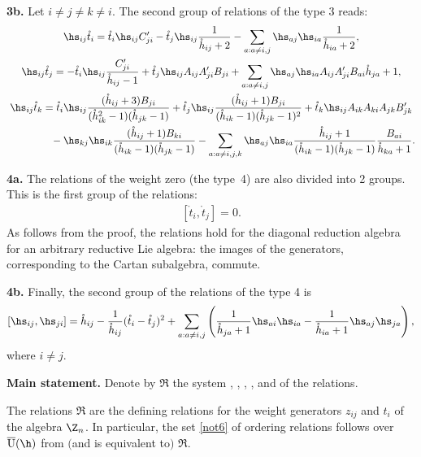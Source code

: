 \documentclass[pdftex]{sigma}
\def\Cprime{C'}\def\ds{\displaystyle}\newcommand{\fracds}[2]{{\ds \frac{#1}{#2}}}
\def\nplus{\mathfrak{n}}\def\nn{\nonumber}\def\nin{\noindent}
\def\s{z}\def\S{\mathrm {S}}\def\si{\sigma}\def\Sp{\S^{\nplus}}\def\sy{\acute{\sigma}}\def\th{\mathring{h}}
\def\tphi{A}\def\tpsi{A'}\def\tphiplus{B}\def\tpsiminus{B'}\def\ttphi{B}\def\ttpsi{B'}\def\ts{\hskip1pt}\def\tts{\hskip.5pt}
\def\tt{\mathring{t}}\def\U{\mathrm{U}}\def\Uh{\overline{\U}(\h)}\def\UU{\overline{\U}}\def\UUh{{\cal{D}}(\h)}
\numberwithin{equation}{section}
\begin{document}
{\bf 3b.} Let $i\neq j\neq k\neq i$. The second group of relations of the type 3 reads:
\begin{gather}\notag\hs_{ij}\tt_{i}=  \tt_i\hs_{ij}\Cprime_{ji}-\tt_j\hs_{ij}  \frac{1}{\th_{ij}+2}-
\sum_{a:a\not=i,j}\hs_{aj}\hs_{ia}  \frac{1}{\th_{ia}+2}  ,\\
\label{3.12}\hs_{ij}\tt_{j}= -\tt_i\hs_{ij}  \frac{\Cprime_{ji}}{\th_{ij}-1}+
\tt_j\hs_{ij}\tphi_{ij}\tpsi_{ji}\ttphi_{ji}+
\sum_{a:a\not=i,j}\hs_{aj}\hs_{ia}\tphi_{ij}\tpsi_{ji}{\ttphi_{ai}}{\th_{ja}+1}  ,\\  \notag
\hs_{ij}\tt_{k}= \tt_i\hs_{ij}  \frac{(\th_{ij}+3)\ttphi_{ji}}{(\th_{ik}^2-1)(\th_{jk}-1)}+
\tt_j\hs_{ij}  \frac{(\th_{ij}+1)\ttphi_{ji}}{(\th_{ik}-1)(\th_{jk}-1)^2}+
\tt_k\hs_{ij}\tphi_{ik}\tphi_{ki}\tphi_{jk}\ttpsi_{jk}\\
  \notag
  \phantom{\hs_{ij}\tt_{k}=}{}
- \hs_{kj}\hs_{ik}  \frac{(\th_{ij}+1)\ttphi_{ki}}{(\th_{ik}-1)(\th_{jk}-1)}
-\sum_{a:a\not=i,j,k}\hs_{aj}\hs_{ia}  \frac{\th_{ij}+1}{(\th_{ik}-1)(\th_{jk}-1)}
\frac{\ttphi_{ai}}{\th_{ka}+1}  .
\end{gather}

{\bf 4a.} The relations of the weight zero (the type~4) are also divided into 2 groups.
This is the f\/irst group of the relations:
\begin{gather}
 \label{relation4a}[\tt_i,\tt_j]=0.
 \end{gather}
As follows from the proof, the relations  hold for the diagonal reduction algebra for an arbitrary reductive
Lie algebra: the images of the generators, corresponding to the Cartan subalgebra, commute.

{\bf 4b.} Finally, the second group of the relations of the type 4 is
\begin{gather}
 \label{relation4}
 [\hs_{ij},\hs_{ji}]=\th_{ij}-\frac{1}{\th_{ij}}(\tt_i-\tt_j)^2+
\sum_{a:a\not=i,j}\left(\frac{1}{\th_{ja}+1}\hs_{ai}\hs_{ia}-\frac{1}{\th_{ia}+1}\hs_{aj}\hs_{ja}\right) ,
\end{gather}
where $i\neq j$.

{\bf Main statement.} Denote by $\mathfrak{R}$  the system ,  , ,
,   and  of the relations.

\begin{theorem} \label{mthe}
The relations $\mathfrak{R}$ are the defining relations for the weight generators $\s_{ij}$ and
$t_i$ of the algebra $\Z_n$. In particular, the set  \eqref{not6} of ordering relations follows over $\Uh$ from $($and is equivalent to$)$  $\mathfrak{R}$.
\end{theorem}
\end{document}
